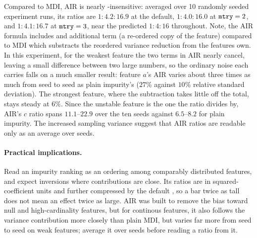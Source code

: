 %
Compared to MDI, AIR is nearly
-insensitive: averaged over 10 randomly seeded experiment runs, its ratios are
$1:4.2:16.9$ at the
default, $1:4.0:16.0$ at $\texttt{mtry}=2$, and $1:4.1:16.7$ at $\texttt{mtry}=3$,
near the predicted $1:4:16$ throughout.
%
Note, the AIR formula includes and additional term (a re-ordered copy of the feature) compared to MDI which 
substracts the reordered variance reduction from the features own.
In this experiment, for the weakest feature the two terms in AIR nearly cancel, leaving a small difference
between two large numbers, so the ordinary noise each carries falls on a much
smaller result: feature $a$'s AIR varies about three times as much from seed to
seed as plain impurity's ($27\%$ against $10\%$ relative standard deviation).
The strongest feature, where the subtraction takes little off the total, stays
steady at $6\%$. Since the unstable feature is the one the ratio divides by,
AIR's $c$ ratio spans $11.1$--$22.9$ over the ten seeds against $6.5$--$8.2$
for plain impurity. The increased sampling variance suggest that AIR ratios 
are readable only as an average over seeds.


\paragraph{Practical implications.} Read an impurity ranking as an ordering
among comparably distributed features, and expect inversions where
contributions are close. Its ratios are in squared-coefficient units and
further compressed by the default , so a bar twice as tall does not
mean an effect twice as large. AIR was built to remove the bias
toward null and high-cardinality features, but for continous features, it also follows the
variance contribution more closely than plain MDI, but varies far more from seed to seed on
weak features; average it over seeds before reading a ratio from it.
